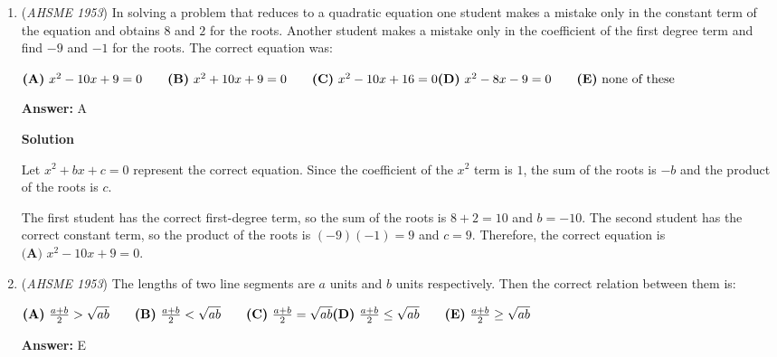 \begin{enumerate}
It turns out that none of the listed solutions are the true solution for the problem as written, so we'll edit it slightly by replacing "percent" with "proportion". To solve the modified problem, note that the price of the article is $1+p$ times what it was originally, so that demand must be at least $\frac{1}{1+p}$ times what it was originally to yield at least the same income. Since $1-d = \frac{1}{1+p}$, this implies that $d = \frac{p}{1+p}$. Thusly, our answer is $\boxed{\text{(C)}}$, and we are done.

 


	\item (\textit{AHSME 1953}) In solving a problem that reduces to a quadratic equation one student makes a mistake only in the constant term of the equation and 
obtains $8$ and $2$ for the roots. Another student makes a mistake only in the coefficient of the first degree term and 
find $-9$ and $-1$ for the roots. The correct equation was: 


 $\textbf{(A)}\ x^2-10x+9=0 \qquad \textbf{(B)}\ x^2+10x+9=0 \qquad \textbf{(C)}\ x^2-10x+16=0\\  \textbf{(D)}\ x^2-8x-9=0\qquad \textbf{(E)}\ \text{none of these}$

 \textbf{Answer: }A



\textbf{Solution}

Let $x^2+bx+c=0$ represent the correct equation. Since the coefficient of the $x^2$ term is $1$, the sum of the roots is $-b$ and the product of the roots is $c$.

 The first student has the correct first-degree term, so the sum of the roots is $8+2=10$ and $b=-10$. The second student has the correct constant term, so the product of the roots is $(-9)(-1) = 9$ and $c=9$. Therefore, the correct equation is $\boxed{\textbf{(A) } x^2-10x+9=0}$.

 


	\item (\textit{AHSME 1953}) The lengths of two line segments are $a$ units and $b$ units respectively. Then the correct relation between them is: 


 $\textbf{(A)}\ \frac{a+b}{2} > \sqrt{ab} \qquad \textbf{(B)}\ \frac{a+b}{2} < \sqrt{ab} \qquad \textbf{(C)}\ \frac{a+b}{2}=\sqrt{ab}\\ \textbf{(D)}\ \frac{a+b}{2}\leq\sqrt{ab}\qquad \textbf{(E)}\ \frac{a+b}{2}\geq\sqrt{ab}$

 \textbf{Answer: }E




\end{enumerate}
